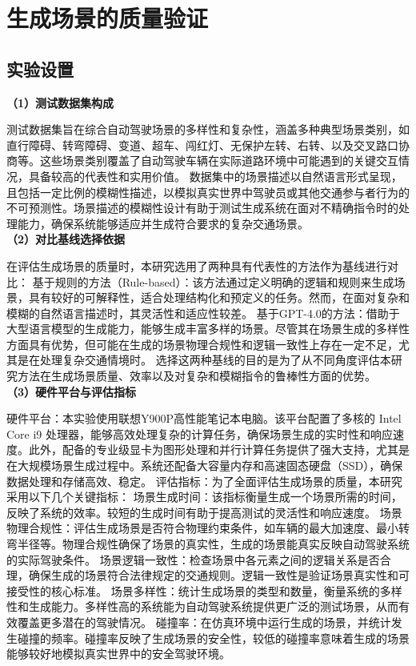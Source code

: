 \chapter{生成场景的质量验证}
\section{实验设置}
\textbf{（1）测试数据集构成} \par
测试数据集旨在综合自动驾驶场景的多样性和复杂性，涵盖多种典型场景类别，如直行障碍、转弯障碍、变道、超车、闯红灯、无保护左转、右转、以及交叉路口协商等。这些场景类别覆盖了自动驾驶车辆在实际道路环境中可能遇到的关键交互情况，具备较高的代表性和实用价值。
数据集中的场景描述以自然语言形式呈现，且包括一定比例的模糊性描述，以模拟真实世界中驾驶员或其他交通参与者行为的不可预测性。场景描述的模糊性设计有助于测试生成系统在面对不精确指令时的处理能力，确保系统能够适应并生成符合要求的复杂交通场景。\\
\indent\textbf{（2）对比基线选择依据} \par
在评估生成场景的质量时，本研究选用了两种具有代表性的方法作为基线进行对比：
基于规则的方法（Rule-based）：该方法通过定义明确的逻辑和规则来生成场景，具有较好的可解释性，适合处理结构化和预定义的任务。然而，在面对复杂和模糊的自然语言描述时，其灵活性和适应性较差。
基于GPT-4.0的方法：借助于大型语言模型的生成能力，能够生成丰富多样的场景。尽管其在场景生成的多样性方面具有优势，但可能在生成的场景物理合规性和逻辑一致性上存在一定不足，尤其是在处理复杂交通情境时。
选择这两种基线的目的是为了从不同角度评估本研究方法在生成场景质量、效率以及对复杂和模糊指令的鲁棒性方面的优势。\\
\indent\textbf{（3）硬件平台与评估指标} \par
硬件平台：本实验使用联想Y900P高性能笔记本电脑。该平台配置了多核的 Intel Core i9 处理器，能够高效处理复杂的计算任务，确保场景生成的实时性和响应速度。此外，配备的专业级显卡为图形处理和并行计算任务提供了强大支持，尤其是在大规模场景生成过程中。系统还配备大容量内存和高速固态硬盘（SSD），确保数据处理和存储高效、稳定。
评估指标：为了全面评估生成场景的质量，本研究采用以下几个关键指标：
场景生成时间：该指标衡量生成一个场景所需的时间，反映了系统的效率。较短的生成时间有助于提高测试的灵活性和响应速度。
场景物理合规性：评估生成场景是否符合物理约束条件，如车辆的最大加速度、最小转弯半径等。物理合规性确保了场景的真实性，生成的场景能真实反映自动驾驶系统的实际驾驶条件。
场景逻辑一致性：检查场景中各元素之间的逻辑关系是否合理，确保生成的场景符合法律规定的交通规则。逻辑一致性是验证场景真实性和可接受性的核心标准。
场景多样性：统计生成场景的类型和数量，衡量系统的多样性和生成能力。多样性高的系统能为自动驾驶系统提供更广泛的测试场景，从而有效覆盖更多潜在的驾驶情况。
碰撞率：在仿真环境中运行生成的场景，并统计发生碰撞的频率。碰撞率反映了生成场景的安全性，较低的碰撞率意味着生成的场景能够较好地模拟真实世界中的安全驾驶环境。





